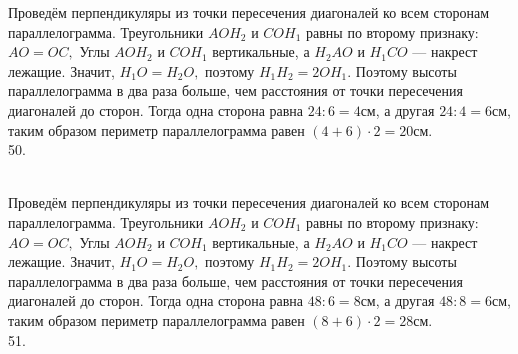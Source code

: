 \documentclass[12pt]{article}
\begin{document}
Проведём перпендикуляры из точки пересечения диагоналей ко всем сторонам параллелограмма. Треугольники $AOH_2$ и $COH_1$ равны по второму признаку: $AO=OC,$ Углы $AOH_2$ и $COH_1$ вертикальные, а $H_2AO$ и $H_1CO$ --- накрест лежащие. Значит, $H_1O=H_2O,$ поэтому $H_1H_2=2OH_1.$ Поэтому высоты параллелограмма в два раза больше, чем расстояния от точки пересечения диагоналей до сторон. Тогда одна сторона равна $24:6=4$см, а другая $24:4=6$см, таким образом периметр параллелограмма равен $(4+6)\cdot2=20$см.\\
50. \begin{figure}[ht!]
\end{figure}\\
Проведём перпендикуляры из точки пересечения диагоналей ко всем сторонам параллелограмма. Треугольники $AOH_2$ и $COH_1$ равны по второму признаку: $AO=OC,$ Углы $AOH_2$ и $COH_1$ вертикальные, а $H_2AO$ и $H_1CO$ --- накрест лежащие. Значит, $H_1O=H_2O,$ поэтому $H_1H_2=2OH_1.$ Поэтому высоты параллелограмма в два раза больше, чем расстояния от точки пересечения диагоналей до сторон. Тогда одна сторона равна $48:6=8$см, а другая $48:8=6$см, таким образом периметр параллелограмма равен $(8+6)\cdot2=28$см.\\
51. \begin{figure}[ht!]
\end{figure}\\
\end{document}
